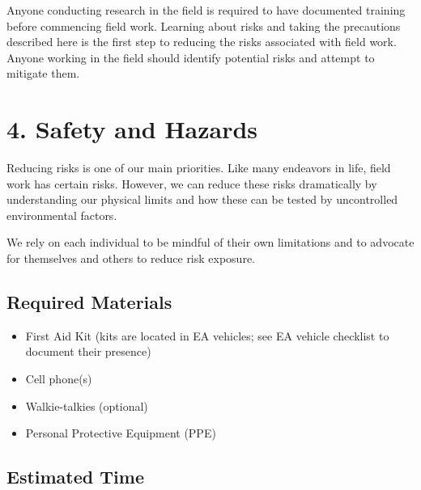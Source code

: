 \documentclass[
  11pt,
  letterpaper,
]{article}
\providecommand{\tightlist}{%
  \setlength{\itemsep}{0pt}\setlength{\parskip}{0pt}}
\begin{document}
Anyone conducting research in the field is required to have documented
training before commencing field work. Learning about risks and taking
the precautions described here is the first step to reducing the risks
associated with field work. Anyone working in the field should identify
potential risks and attempt to mitigate them.

\section{4. Safety and Hazards}\label{safety-and-hazards}

\begin{tcolorbox}[enhanced jigsaw, colback=white, titlerule=0mm, leftrule=.75mm, left=2mm, toptitle=1mm, rightrule=.15mm, title=\textcolor{quarto-callout-warning-color}{\faExclamationTriangle}\hspace{0.5em}{General Field Hazards}, opacitybacktitle=0.6, bottomrule=.15mm, breakable, opacityback=0, colframe=quarto-callout-warning-color-frame, coltitle=black, arc=.35mm, bottomtitle=1mm, colbacktitle=quarto-callout-warning-color!10!white, toprule=.15mm]

Reducing risks is one of our main priorities. Like many endeavors in
life, field work has certain risks. However, we can reduce these risks
dramatically by understanding our physical limits and how these can be
tested by uncontrolled environmental factors.

We rely on each individual to be mindful of their own limitations and to
advocate for themselves and others to reduce risk exposure.

\end{tcolorbox}

\subsection{Required Materials}\label{required-materials}

\begin{itemize}
\tightlist
\item
  First Aid Kit (kits are located in EA vehicles; see EA vehicle
  checklist to document their presence)
\item
  Cell phone(s)
\item
  Walkie-talkies (optional)
\item
  Personal Protective Equipment (PPE)
\end{itemize}

\subsection{Estimated Time}\label{estimated-time}
\end{document}
